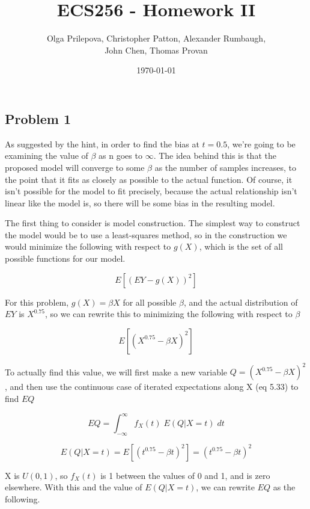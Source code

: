 \documentclass[letter]{article}
\author{Olga Prilepova, Christopher Patton, Alexander Rumbaugh, \\ John Chen, Thomas Provan}
\date{\today}
\title{ECS256 - Homework II}
\begin{document}
\maketitle


\subsection*{Problem 1} 

As suggested by the hint, in order to find the bias at $t=0.5$, we're going to be examining the value of $\beta$ as n goes to $\infty$. The idea behind this is that the proposed model will converge to some $\beta$ as the number of samples increases, to the point that it fits as closely as possible to the actual function. Of course, it isn't possible for the model to fit precisely, because the actual relationship isn't linear like the model is, so there will be some bias in the resulting model. 

The first thing to consider is model construction. The simplest way to construct the model would be to use a least-squares method, so in the construction we would  minimize the following with respect to $g(X)$, which is the set of all possible functions for our model.

\begin{equation}
	E[(EY - g(X))^2]
\end{equation}

For this problem, $g(X)=\beta X$ for all possible $\beta$, and the actual distribution of $EY$ is $X^{0.75}$, so we can rewrite this to minimizing the following with respect to $\beta$

\begin{equation}
	E[(X^{0.75} - \beta X)^2]
\end{equation}

To actually find this value, we will first make a new variable $Q=(X^{0.75} - \beta X)^2$, and then use the continuous case of iterated expectations along X (eq 5.33) to find $EQ$

\begin{equation}
	EQ = \int _{-\infty} ^\infty f_X(t) \; E(Q | X = t)\; dt
\end{equation}

\begin{equation}
	E(Q | X = t) = E[(t^{0.75} - \beta t)^2] = (t^{0.75} - \beta t)^2
\end{equation}

X is $U(0,1)$, so $f_X(t)$ is 1 between the values of 0 and 1, and is zero elsewhere. With this and the value of $E(Q | X = t)$, we can rewrite $EQ$ as the following.
\end{document}
